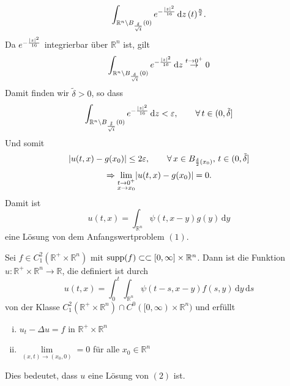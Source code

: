 \begin{beweis}
\[		\int_{\mathbb{R}^n \setminus B_{\frac{\delta }{\sqrt{t}}}(0)}^{} e^{- \frac{\lvert z\rvert^2}{16}} \,\mathrm{d}z \, (t)^{\frac{n}{2}}.
	\]
	Da $e^{- \frac{\lvert z\rvert^2}{16}}$ integrierbar über $\mathbb{R}^n$ ist, gilt 
	\[
		\int_{\mathbb{R}^n \setminus B_{\frac{\delta }{\sqrt{t}}}(0)}^{} e^{- \frac{\lvert z\rvert^2}{16}} \,\mathrm{d}z \stackrel{t \to 0^+}{\to } 0
	\]
	Damit finden wir $\tilde \delta >0$, so dass 
	\[
		\int_{\mathbb{R}^n \setminus B_{\frac{\tilde \delta }{\sqrt{t}}}(0)}^{} e^{- \frac{\lvert z\rvert^2}{16}} \,\mathrm{d}z < \varepsilon,
		 \qquad \forall\, t \in (0,\tilde \delta ]
	\]
	Und somit
	\[
		\lvert u(t,x)-g(x_0)\rvert \leq 2 \varepsilon, \qquad \forall\, x \in B_{\frac{\delta }{2}(x_0)}, \,t \in (0, \tilde \delta]
	\]
	\[
		\Rightarrow \lim_{\substack{t \to 0^+ \\ x \to x_0}} \lvert u(t,x)-g(x_0)\rvert = 0.
	\]
	Damit ist
	\[
		u(t,x)= \int_{\mathbb{R}^n}^{} \psi(t,x-y)g(y) \,\mathrm{d}y
	\]
	eine Lösung von dem Anfangswertproblem $(1)$.
\end{beweis}
\begin{satz}
	Sei $f \in C_1^2(\mathbb{R}^{+} \times \mathbb{R}^n)$ mit $\operatorname{supp}(f) \subset \subset [0,\infty] \times \mathbb{R}^n$. Dann ist die Funktion $u : \mathbb{R}^{+} \times \mathbb{R}^n \to \mathbb{R}$, die definiert ist durch
	\[
		u(t,x)= \int_{0}^{t} \int_{\mathbb{R}^n}^{} \psi(t-s,x-y)f(s,y) \,\mathrm{d}y \,\mathrm{d}s
	\]
	von der Klasse $C_1^2(\mathbb{R}^{+} \times \mathbb{R}^n) \cap C^0([0,\infty)\times \mathbb{R}^n)$ und erfüllt
	\begin{enumerate}[(i)]
		\item $u_t- \Delta u =f$ in $\mathbb{R}^{+} \times \mathbb{R}^n$
		\item $\lim\limits_{(x,t) \to (x_0,0)}=0$ für alle $x_0 \in \mathbb{R}^n$
	\end{enumerate}
	Dies bedeutet, dass $u$ eine Lösung von $(2)$ ist.
\end{satz}
